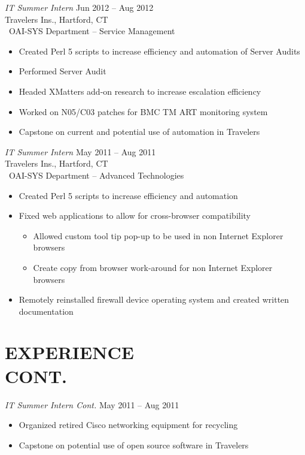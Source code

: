 \documentclass[margin]{res}
\begin{document}
\begin{resume}
   {\sl IT Summer Intern} \hfill Jun 2012 -- Aug 2012 \\
   Travelers Ins., Hartford, CT\\\
   OAI-SYS Department -- Service Management
   \begin{itemize} %
      \item Created Perl 5 scripts to increase efficiency and
         automation of Server Audits
      \item Performed Server Audit
      \item Headed XMatters add-on research to increase escalation
         efficiency
      \item Worked on N05/C03 patches for BMC TM ART monitoring
         system
      \item Capstone on current and potential use of
         automation in Travelers
   \end{itemize}

   {\sl IT Summer Intern} \hfill  May 2011 -- Aug 2011 \\
   Travelers Ins., Hartford, CT\\\
   OAI-SYS Department -- Advanced Technologies
   \begin{itemize}   %
      \item Created Perl 5 scripts to increase efficiency and
         automation
      \item Fixed web applications to allow for cross-browser
         compatibility
         \begin{itemize} %
            \item Allowed custom tool tip pop-up to be used in non
               Internet Explorer \\browsers
            \item Create copy from browser work-around for non
               Internet Explorer \\browsers
         \end{itemize}
      \item Remotely reinstalled firewall device operating
         system and created written \\documentation
   \end{itemize}

   \section{EXPERIENCE \\ CONT.}
   {\sl IT Summer Intern Cont.} \hfill May 2011 -- Aug 2011
   \begin{itemize}  %
      \item Organized retired Cisco networking equipment for
         recycling
      \item Capstone on potential use of open source software
         in Travelers
   \end{itemize}

\end{resume}
\end{document}
